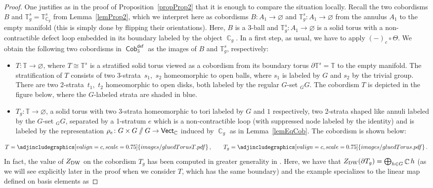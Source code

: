 \documentclass[10pt,a4paper]{amsart}
\DeclareMathOperator{\vect}{\mathsf{Vect}}
\DeclareMathOperator{\C}{\mathbb{C}}
\DeclareMathOperator{\Cob}{\mathsf{Cob}}
\newcommand{\sslash}{\mathbin{/\mkern-6mu/}}
\numberwithin{equation}{section}
\theoremstyle{definition}
\begin{document}
\begin{proof}
 One justifies as in the proof of Proposition~\ref{propProp2} that it is enough to compare the situation locally. Recall the two cobordisms $B$ and $\mathbb{T}_g^s = \mathbb{T}_{\C_g}^s$ from Lemma~\ref{lemProp2}, which we interpret here as cobordisms $B\colon A_1 \rightarrow \varnothing$ and $\mathbb{T}_g^s\colon A_1 \rightarrow \varnothing$ from the annulus $A_1$ to the empty manifold (this is simply done by flipping their orientations). Here, $B$ is a 3-ball and $\mathbb{T}_g^s\colon A_1 \rightarrow \varnothing$ is a solid torus with a non-contractible defect loop embedded in its boundary labeled by the object $\C_g$.
 In a first step, as usual, we have to apply $(-)_c \circ \Theta$. We obtain the following two cobordisms in $\Cob_3^{\mathsf{def}}$ as the images of $B$ and $\mathbb{T}_g^s$, respectively:
 \begin{itemize}\itemsep=0pt
 \item $T\colon \mathbb{T} \rightarrow \varnothing$, where $T \cong \mathbb{T}^s$ is a stratified solid torus viewed as a cobordism from its boundary torus $\partial \mathbb{T}^s = \mathbb{T}$ to the empty manifold. The stratification of $T$ consists of two 3-strata~$s_1$,~$s_2$ homeomorphic to open balls, where $s_1$ is labeled by $G$ and $s_2$ by the trivial group. There are two 2-strata~$t_1$,~$t_2$ homeomorphic to open disks, both labeled by the regular $G$-set $_G G$. The cobordism $T$ is depicted in the figure below, where the $G$-labeled strata are shaded in blue.
 \item $T_g\colon \mathbb{T} \rightarrow \varnothing$, a solid torus with two 3-strata homeomorphic to tori labeled by $G$ and $1$ respectively, two 2-strata shaped like annuli labeled by the $G$-set $_GG$, separated by a 1-stratum $e$ which is a non-contractible loop (with suppressed node labeled by the identity) and is labeled by the representation $\rho_e\colon G \times G \sslash G \rightarrow \vect_{\C}$ induced by $\C_g$ as in Lemma~\ref{lemEqCob}. The cobordism is shown below:
 \end{itemize}
 \begin{align*}
 T = \adjincludegraphics[valign=c, scale = 0.75]{images/gluedTorusT.pdf}\,, \qquad T_g = \adjincludegraphics[valign=c, scale = 0.75]{images/gluedTorus.pdf}\,.
 \end{align*}
 In fact, the value of $Z_{\rm DW}$ on the cobordism $T_g$ has been computed in greater generality in \cite[Example~7.10]{FMM}. Here, we have that $Z_{\rm DW}(\partial T_g) = \bigoplus_{h \in G} \C h$ (as we will see explicitly later in the proof when we consider $T$, which has the same boundary) and the example specializes to the linear map defined on basis elements as

\end{proof}
\end{document}
